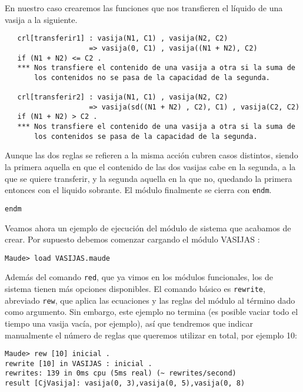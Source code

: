 En nuestro caso crearemos las funciones que nos transfieren el líquido de una vasija a la siguiente.\par 
{\codesize
\begin{verbatim}
   crl[transferir1] : vasija(N1, C1) , vasija(N2, C2) 
                    => vasija(0, C1) , vasija((N1 + N2), C2) 
   if (N1 + N2) <= C2 .
   *** Nos transfiere el contenido de una vasija a otra si la suma de 
       los contenidos no se pasa de la capacidad de la segunda.

   crl[transferir2] : vasija(N1, C1) , vasija(N2, C2) 
                    => vasija(sd((N1 + N2) , C2), C1) , vasija(C2, C2)
   if (N1 + N2) > C2 .
   *** Nos transfiere el contenido de una vasija a otra si la suma de 
       los contenidos se pasa de la capacidad de la segunda.
\end{verbatim}
}
Aunque las dos reglas se refieren a la misma acción cubren casos distintos, siendo la primera aquella en que el contenido de las dos vasijas cabe en la segunda, a la que se quiere transferir, y la segunda aquella en la que no, quedando la primera entonces con el liquido sobrante. El módulo finalmente se cierra con \texttt{endm}.
{\codesize
\begin{verbatim}
endm
\end{verbatim}
}


Veamos ahora un ejemplo de ejecución del módulo de sistema que acabamos de crear. Por supuesto debemos comenzar cargando el módulo VASIJAS :\par

{\codesize
\begin{verbatim}
Maude> load VASIJAS.maude
\end{verbatim}
}

Además del comando \texttt{red}, que ya vimos en los módulos funcionales, los de sistema tienen más opciones disponibles. El comando básico es \texttt{rewrite}, abreviado \texttt{rew}, que aplica las ecuaciones y las reglas del módulo al término dado como argumento. Sin embargo, este ejemplo no termina (es posible vaciar todo el tiempo
una vasija vacía, por ejemplo), así que tendremos que indicar manualmente el número de reglas que queremos utilizar en total, por ejemplo 10:

{\codesize
\begin{verbatim}
Maude> rew [10] inicial .
rewrite [10] in VASIJAS : inicial .
rewrites: 139 in 0ms cpu (5ms real) (~ rewrites/second)
result [CjVasija]: vasija(0, 3),vasija(0, 5),vasija(0, 8)
\end{verbatim}
}

